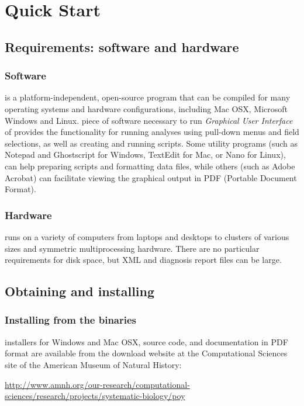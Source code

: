 \chapter{\poy Quick Start}

\section{Requirements: software and hardware}

\subsection{Software}
\poy is a platform-independent, open-source program that can be
compiled for many operating systems and hardware configurations,
including Mac OSX, Microsoft Windows and Linux. %
piece of software necessary to run \poy%
\emph{Graphical User Interface} of \poy provides the functionality
for running analyses using pull-down menus and field selections,
as well as creating and running \poy scripts. Some utility programs
(such as Notepad and Ghostscript for Windows, TextEdit for Mac, or
Nano for Linux), can help preparing \poy scripts and formatting
data files, while others (such as Adobe Acrobat) can facilitate
viewing the graphical output in PDF (Portable Document Format).

\subsection{Hardware}
\poy runs on a variety of computers from laptops and desktops to
clusters of various sizes and symmetric multiprocessing hardware.
There are no particular requirements for disk space, but XML and
diagnosis report files can be large.

\section{Obtaining and installing \poy}
\subsection{Installing from the binaries}
\poy installers for Windows and Mac OSX, source code, and documentation
in PDF format are available from the \poy download website at the
Computational Sciences site of the American Museum of Natural
History:

\begin{center}
\url{http://www.amnh.org/our-research/computational-sciences/research/projects/systematic-biology/poy}
\end{center}

